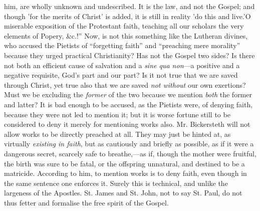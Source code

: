 him, are wholly unknown and undescribed. It is the law, and not the
Gospel; and though 'for the merits of Christ' is added, it is still in
reality 'do this and live.'O miserable exposition of the Protestant
faith, teaching all our scholars the very elements of Popery, \&c.!''
Now, is not this something like the Lutheran divines, who accused the
Pietists of ``forgetting faith'' and ``preaching mere morality'' because
they urged practical Christianity? Has not the Gospel two sides? Is
there not both an efficient cause of salvation and a \emph{sine qua non}—a
positive and a negative requisite, God's part and our part? Is it not
true that we are saved through Christ, yet true also that we are saved \emph{not
without} our own exertions? Must we be excluding the \emph{former} of
the two because we mention \emph{both} the former and latter? It is bad
enough to be accused, as the Pietists were, of denying faith, because
they were not led to mention it; but it is worse fortune still to be
considered to deny it merely for mentioning works also. Mr. Bickersteth
will not allow works to be directly preached at all. They may just be
hinted at, as virtually \emph{existing in faith}, but as cautiously and
briefly as possible, as if it were a dangerous secret, scarcely safe to
breathe,—as if, though the mother were fruitful, the birth was sure to
be fatal, or the offspring unnatural, and destined to be a matricide.
According to him, to mention works is to deny faith, even though in the
same sentence one enforces it. Surely this is technical, and unlike the
largeness of the Apostles. St. James and St. John, not to say St. Paul,
do not thus fetter and formalise the free spirit of the Gospel.

